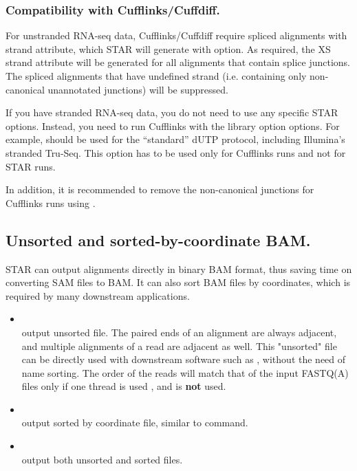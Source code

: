 \documentclass[12pt]{article}
\begin{document}
\subsubsection{Compatibility with Cufflinks/Cuffdiff.}
For unstranded RNA-seq data, Cufflinks/Cuffdiff require spliced alignments with  strand attribute, which STAR will generate with   option. As required, the XS strand attribute will be generated for all alignments that contain splice junctions. The spliced alignments that have undefined strand (i.e. containing only non-canonical unannotated junctions) will be suppressed.

If you have stranded RNA-seq data, you do not need to use any specific STAR options. Instead, you need to run Cufflinks with the library option  options. For example,  should be used for the “standard” dUTP protocol, including Illumina's stranded Tru-Seq. This option has to be used only for Cufflinks runs and not for STAR runs.

In addition, it is recommended to remove the non-canonical junctions for Cufflinks runs using  .

\subsection{Unsorted and sorted-by-coordinate BAM.}
STAR can output alignments directly in binary BAM format, thus saving time on converting SAM files to BAM. It can also sort BAM files by coordinates, which is required by many downstream applications.
\begin{itemize}
\raggedright
\item[]
 \\
output unsorted  file. The paired ends of an alignment are always adjacent, and multiple alignments of a read are adjacent as well. This "unsorted" file can be directly used with downstream software such as , without the need of name sorting. The order of the reads will match that of the input FASTQ(A) files only if one thread is used  , and   is \textbf{not} used.
\item[]
 \\
output sorted by coordinate  file, similar to  command.
\item[]
 \\
output both unsorted and sorted files.
\end{itemize}
\end{document}
